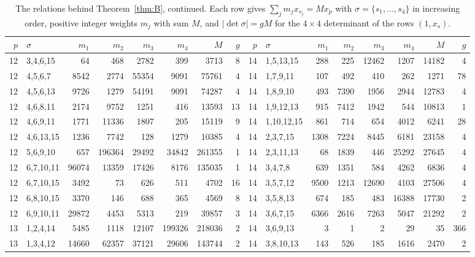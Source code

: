 \begin{table}[tp]
\scriptsize
\caption{The relations behind Theorem~\ref{thm:B}, continued. Each row gives $\sum_j m_j x_{s_j}=M x_p$ with $\sigma=\{s_1,\dots,s_4\}$ in increasing order, positive integer weights $m_j$ with sum $M$, and $|\det\sigma|=gM$ for the $4\times4$ determinant of the rows $(1,x_s)$.}\label{tab:certBb}
\begin{ruledtabular}
\begin{tabular}{rlrrrrrr@{\hspace{2.2em}}rlrrrrrr}
$p$ & $\sigma$ & $m_1$ & $m_2$ & $m_3$ & $m_4$ & $M$ & $g$ & $p$ & $\sigma$ & $m_1$ & $m_2$ & $m_3$ & $m_4$ & $M$ & $g$ \\ \hline
12 & 3,4,6,15 & 64 & 468 & 2782 & 399 & 3713 & 8 & 14 & 1,5,13,15 & 288 & 225 & 12462 & 1207 & 14182 & 4 \\
12 & 4,5,6,7 & 8542 & 2774 & 55354 & 9091 & 75761 & 4 & 14 & 1,7,9,11 & 107 & 492 & 410 & 262 & 1271 & 78 \\
12 & 4,5,6,13 & 9726 & 1279 & 54191 & 9091 & 74287 & 4 & 14 & 1,8,9,10 & 493 & 7390 & 1956 & 2944 & 12783 & 4 \\
12 & 4,6,8,11 & 2174 & 9752 & 1251 & 416 & 13593 & 13 & 14 & 1,9,12,13 & 915 & 7412 & 1942 & 544 & 10813 & 1 \\
12 & 4,6,9,11 & 1771 & 11336 & 1807 & 205 & 15119 & 9 & 14 & 1,10,12,15 & 861 & 714 & 654 & 4012 & 6241 & 28 \\
12 & 4,6,13,15 & 1236 & 7742 & 128 & 1279 & 10385 & 4 & 14 & 2,3,7,15 & 1308 & 7224 & 8445 & 6181 & 23158 & 4 \\
12 & 5,6,9,10 & 657 & 196364 & 29492 & 34842 & 261355 & 1 & 14 & 2,3,11,13 & 68 & 1839 & 446 & 25292 & 27645 & 4 \\
12 & 6,7,10,11 & 96074 & 13359 & 17426 & 8176 & 135035 & 1 & 14 & 3,4,7,8 & 639 & 1351 & 584 & 4262 & 6836 & 4 \\
12 & 6,7,10,15 & 3492 & 73 & 626 & 511 & 4702 & 16 & 14 & 3,5,7,12 & 9500 & 1213 & 12690 & 4103 & 27506 & 4 \\
12 & 6,8,10,15 & 3370 & 146 & 688 & 365 & 4569 & 8 & 14 & 3,5,8,13 & 674 & 185 & 483 & 16388 & 17730 & 2 \\
12 & 6,9,10,11 & 29872 & 4453 & 5313 & 219 & 39857 & 3 & 14 & 3,6,7,15 & 6366 & 2616 & 7263 & 5047 & 21292 & 2 \\
13 & 1,2,4,14 & 5485 & 1118 & 12107 & 199326 & 218036 & 2 & 14 & 3,6,9,13 & 3 & 1 & 2 & 29 & 35 & 366 \\
13 & 1,3,4,12 & 14660 & 62357 & 37121 & 29606 & 143744 & 2 & 14 & 3,8,10,13 & 143 & 526 & 185 & 1616 & 2470 & 2 \\

\end{tabular}
\end{ruledtabular}
\end{table}

